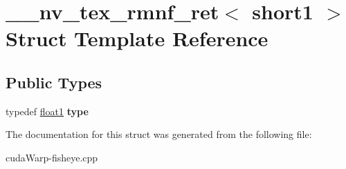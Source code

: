 \hypertarget{struct____nv__tex__rmnf__ret_3_01short1_01_4}{}\section{\+\_\+\+\_\+nv\+\_\+tex\+\_\+rmnf\+\_\+ret$<$ short1 $>$ Struct Template Reference}
\label{struct____nv__tex__rmnf__ret_3_01short1_01_4}
\subsection*{Public Types}
\begin{DoxyCompactItemize}
\item 
typedef \hyperlink{structfloat1}{float1} {\bfseries type}\hypertarget{struct____nv__tex__rmnf__ret_3_01short1_01_4_a6593725fb626f86f4a61c59445d13c45}{}\label{struct____nv__tex__rmnf__ret_3_01short1_01_4_a6593725fb626f86f4a61c59445d13c45}

\end{DoxyCompactItemize}


The documentation for this struct was generated from the following file\+:\begin{DoxyCompactItemize}
\item 
cuda\+Warp-\/fisheye.\+cpp\end{DoxyCompactItemize}
